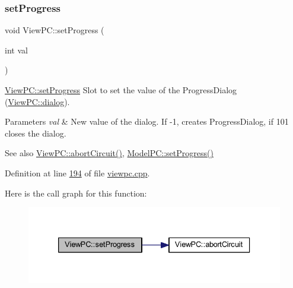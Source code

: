 \subsubsection{\texorpdfstring{set\+Progress}{setProgress}}
{\footnotesize\ttfamily void View\+P\+C\+::set\+Progress (\begin{DoxyParamCaption}\item[{int}]{val }\end{DoxyParamCaption})\hspace{0.3cm}{\ttfamily [slot]}}



\mbox{\hyperlink{class_view_p_c_a9c32a1fdb6ead84e5ada8fba8860c7ed}{View\+P\+C\+::set\+Progress}} Slot to set the value of the Progress\+Dialog (\mbox{\hyperlink{class_view_p_c_a31abbb470fe329b44e6ffee202b903ca}{View\+P\+C\+::dialog}}). 


\begin{DoxyParams}{Parameters}
{\em val} & New value of the dialog. If -\/1, creates Progress\+Dialog, if 101 closes the dialog. \\
\hline
\end{DoxyParams}
\begin{DoxySeeAlso}{See also}
\mbox{\hyperlink{class_view_p_c_ad7ba2fcf1d17862de15e32432823f7b0}{View\+P\+C\+::abort\+Circuit()}}, \mbox{\hyperlink{class_model_p_c_a25a4496e129e87ac96f12257a123b84f}{Model\+P\+C\+::set\+Progress()}} 
\end{DoxySeeAlso}


Definition at line \mbox{\hyperlink{viewpc_8cpp_source_l00194}{194}} of file \mbox{\hyperlink{viewpc_8cpp_source}{viewpc.\+cpp}}.

Here is the call graph for this function\+:
\nopagebreak
\begin{figure}[H]
\begin{center}
\leavevmode
\includegraphics[width=333pt]{class_view_p_c_a9c32a1fdb6ead84e5ada8fba8860c7ed_cgraph}
\end{center}
\end{figure}
\mbox{\label{class_view_p_c_ac05220df875b7c4f24405a5742476ebf}} 
